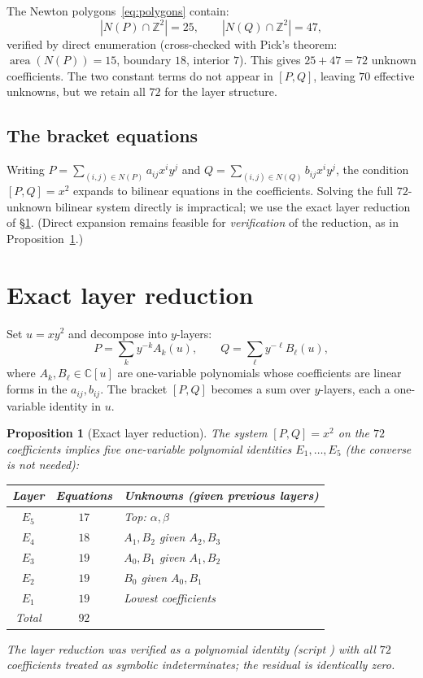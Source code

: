 \documentclass[a4paper,11pt]{article}
\newcommand{\filename}[1]{\texttt{\seqsplit{#1}}}
\theoremstyle{plain}
\newtheorem{proposition}[theorem]{Proposition}
\theoremstyle{definition}
\theoremstyle{remark}
\begin{document}
The Newton polygons~\eqref{eq:polygons} contain:
\begin{equation}
|N(P)\cap\mathbb{Z}^2|=25,\qquad |N(Q)\cap\mathbb{Z}^2|=47,
\end{equation}
verified by direct enumeration (cross-checked with Pick's theorem: $\operatorname{area}(N(P))=15$, boundary $18$, interior $7$). This gives $25+47=72$ unknown coefficients. The two constant terms do not appear in $[P,Q]$, leaving $70$ effective unknowns, but we retain all $72$ for the layer structure.

\subsection{The bracket equations}

Writing $P=\sum_{(i,j)\in N(P)}a_{ij}x^iy^j$ and $Q=\sum_{(i,j)\in N(Q)}b_{ij}x^iy^j$, the condition $[P,Q]=x^2$ expands to bilinear equations in the coefficients. Solving the full $72$-unknown bilinear system directly is impractical; we use the exact layer reduction of \S\ref{sec:layers}. (Direct expansion remains feasible for \emph{verification} of the reduction, as in Proposition~\ref{prop:layers}.)

\section{Exact layer reduction}\label{sec:layers}

Set $u=xy^2$ and decompose into $y$-layers:
\begin{equation}\label{eq:decomp}
P=\sum_{k} y^{-k}A_k(u),\qquad Q=\sum_{\ell} y^{-\ell}B_\ell(u),
\end{equation}
where $A_k,B_\ell\in\mathbb{C}[u]$ are one-variable polynomials whose coefficients are linear forms in the $a_{ij},b_{ij}$. The bracket $[P,Q]$ becomes a sum over $y$-layers, each a one-variable identity in $u$.

\begin{proposition}[Exact layer reduction]\label{prop:layers}
The system $[P,Q]=x^2$ on the $72$ coefficients implies five one-variable polynomial identities $E_1,\dots,E_5$ (the converse is not needed):
\begin{center}
\begin{tabular}{c|c|l}
\textbf{Layer} & \textbf{Equations} & \textbf{Unknowns (given previous layers)} \\
\midrule
$E_5$ & $17$ & Top: $\alpha,\beta$ \\
$E_4$ & $18$ & $A_1,B_2$ given $A_2,B_3$ \\
$E_3$ & $19$ & $A_0,B_1$ given $A_1,B_2$ \\
$E_2$ & $19$ & $B_0$ given $A_0,B_1$ \\
$E_1$ & $19$ & Lowest coefficients \\
\midrule
Total & $92$ & \\
\end{tabular}
\end{center}
The layer reduction was verified as a polynomial identity (script \filename{C1\_layer\_reduction.sing}) with all $72$ coefficients treated as symbolic indeterminates; the residual is identically zero.
\end{proposition}
\end{document}
